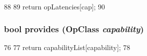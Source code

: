 \begin{DoxyCode}
88 {
89     return opLatencies[cap];
90 }
\end{DoxyCode}
\hypertarget{classFuncUnit_a6d3b2b17239a00dc967226921a945e91}{
\subsubsection[{provides}]{\setlength{\rightskip}{0pt plus 5cm}bool provides ({\bf OpClass} {\em capability})}}
\label{classFuncUnit_a6d3b2b17239a00dc967226921a945e91}



\begin{DoxyCode}
76 {
77     return capabilityList[capability];
78 }
\end{DoxyCode}


